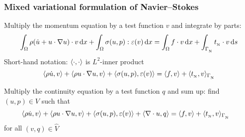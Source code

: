 \begin{frame}
  \frametitle{Mixed variational formulation of Navier--Stokes}

  Multiply the \alert{momentum equation} by a test function $v$ and
  integrate by parts:
  \begin{equation*}
    \int_{\Omega} \rho (\dot{u} + u \cdot \nabla u) \cdot v \, \mathrm{d}x
    + \int_{\Omega} \sigma(u, p) : \varepsilon(v) \, \mathrm{d}x
    = \int_{\Omega} f \cdot v \, \mathrm{d}x
    + \int_{\Gamma_{_\mathrm{N}}} t_{_{\mathrm{N}}} \cdot v \, \mathrm{d}s
  \end{equation*}
  Short-hand notation: $\langle \cdot, \cdot \rangle$ is $L^2$-inner product
  \begin{equation*}
    \langle \rho \dot{u}, v \rangle + \langle \rho u \cdot \nabla u, v \rangle
    + \langle \sigma(u, p), \varepsilon(v) \rangle
    = \langle f, v \rangle
    + \langle t_{_{\mathrm{N}}}, v \rangle_{\Gamma_{_{\mathrm{N}}}}
  \end{equation*}

  \bigskip

  Multiply the \alert{continuity equation} by a test function $q$ and
  sum up: find $(u, p) \in V$ such that
  \begin{align*}
    \langle \rho \dot{u}, v \rangle + \langle \rho u \cdot \nabla u, v \rangle
    + \langle \sigma(u, p), \varepsilon(v) \rangle
    + \langle \nabla \cdot u, q \rangle
    &= \langle f, v \rangle + \langle t_{_{\mathrm{N}}}, v \rangle_{\Gamma_{_{\mathrm{N}}}}
  \end{align*}
  for all $(v, q) \in \hat{V}$

\end{frame}
